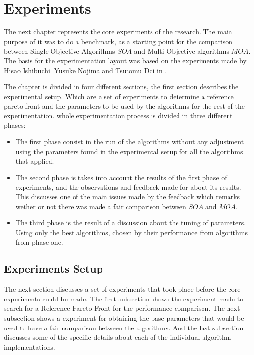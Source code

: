 \chapter{Experiments}
\label{chapter:chapter05}

The next chapter represents the core experiments of the research. The main purpose of it was to do a benchmark, as a starting point for the comparison between Single Objective Algorithms $SOA$ and Multi Objective algorithms $MOA$. The basis for the experimentation layout was based on the experiments made by  Hisao Ishibuchi, Yusuke Nojima and Tsutomu Doi in \cite{Ishibuchi_single_vs_multiobjective}. 

The chapter is divided in four different sections, the first section describes the experimental setup. Which are a set of experiments to determine a reference pareto front and the parameters to be used by the algorithms for the rest of the experimentation. whole experimentation process is divided in three different phases: 

\begin{itemize}
    \item The first phase consist in the run of the algorithms without any adjustment using the parameters found in the experimental setup for all the algorithms that applied. 
    \item The second phase is takes into account the results of the first phase of experiments, and the observations and feedback made for about its results. This discusses one of the main issues made by the feedback which remarks wether or not there was made a fair comparison between $SOA$ and $MOA$.
    \item The third phase is the result of a discussion about the tuning of parameters. Using only the best algorithms, chosen by their performance from algorithms from phase one. 
\end{itemize}

\section{Experiments Setup}

The next section discusses a set of experiments that took place before the core experiments could be made. The first subsection shows the experiment made to search for a Reference Pareto Front for the performance comparison. The next subsection shows a experiment for obtaining the base parameters that would be used to have a fair comparison between the algorithms. And the last subsection discusses some of the specific details about each of the individual algorithm implementations. 

